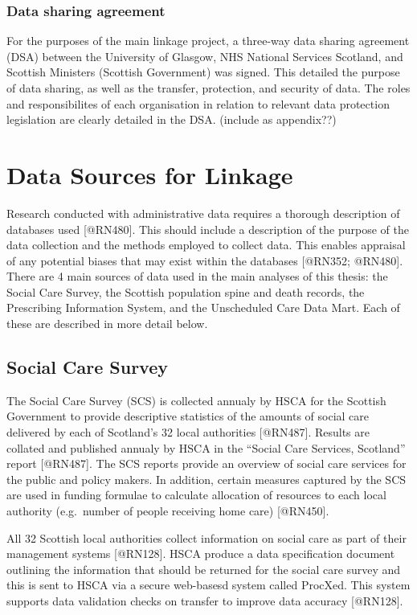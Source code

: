 \documentclass[]{article}
\begin{document}
\subsubsection{Data sharing agreement}\label{subsec:dsa}

For the purposes of the main linkage project, a three-way data sharing
agreement (DSA) between the University of Glasgow, NHS National Services
Scotland, and Scottish Ministers (Scottish Government) was signed. This
detailed the purpose of data sharing, as well as the transfer,
protection, and security of data. The roles and responsibilites of each
organisation in relation to relevant data protection legislation are
clearly detailed in the DSA. (include as appendix??)

\section{Data Sources for Linkage}\label{sec:sources}

Research conducted with administrative data requires a thorough
description of databases used {[}@RN480{]}. This should include a
description of the purpose of the data collection and the methods
employed to collect data. This enables appraisal of any potential biases
that may exist within the databases {[}@RN352; @RN480{]}. There are 4
main sources of data used in the main analyses of this thesis: the
Social Care Survey, the Scottish population spine and death records, the
Prescribing Information System, and the Unscheduled Care Data Mart. Each
of these are described in more detail below.

\subsection{Social Care Survey}\label{subsec:source-sc}

The Social Care Survey (SCS) is collected annualy by HSCA for the
Scottish Government to provide descriptive statistics of the amounts of
social care delivered by each of Scotland's 32 local authorities
{[}@RN487{]}. Results are collated and published annualy by HSCA in the
``Social Care Services, Scotland'' report {[}@RN487{]}. The SCS reports
provide an overview of social care services for the public and policy
makers. In addition, certain measures captured by the SCS are used in
funding formulae to calculate allocation of resources to each local
authority (e.g.~number of people receiving home care) {[}@RN450{]}.

All 32 Scottish local authorities collect information on social care as
part of their management systems {[}@RN128{]}. HSCA produce a data
specification document outlining the information that should be returned
for the social care survey and this is sent to HSCA via a secure
web-basesd system called ProcXed. This system supports data validation
checks on transfer to improve data accuracy {[}@RN128{]}.
\end{document}
